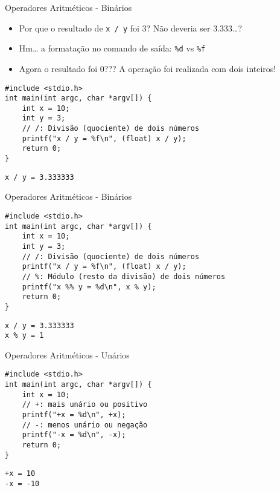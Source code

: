 \documentclass[t, aspectratio=169]{beamer}
\begin{document}
\begin{frame}[label={sec:orgf51f90c},fragile]{Operadores Aritméticos - Binários}
 \begin{itemize}
\item Por que o resultado de \texttt{x / y} foi 3? Não deveria ser 3.333\ldots{}?
\item Hm\ldots{} a formatação no comando de saída: \texttt{\%d} vs \texttt{\%f}
\item Agora o resultado foi 0??? A operação foi realizada com dois \alert{inteiros!}
\end{itemize}

\vspace{-0.25cm}
\begin{verbatim}
#include <stdio.h>
int main(int argc, char *argv[]) {
    int x = 10;
    int y = 3;
    // /: Divisão (quociente) de dois números
    printf("x / y = %f\n", (float) x / y);
    return 0;
}
\end{verbatim}

\begin{verbatim}
x / y = 3.333333
\end{verbatim}
\end{frame}

\begin{frame}[label={sec:org64bba93},fragile]{Operadores Aritméticos - Binários}
 \vspace{-0.5cm}
\begin{verbatim}
#include <stdio.h>
int main(int argc, char *argv[]) {
    int x = 10;
    int y = 3;
    // /: Divisão (quociente) de dois números
    printf("x / y = %f\n", (float) x / y);
    // %: Módulo (resto da divisão) de dois números
    printf("x %% y = %d\n", x % y);
    return 0;
}
\end{verbatim}

\begin{verbatim}
x / y = 3.333333
x % y = 1
\end{verbatim}
\end{frame}

\begin{frame}[label={sec:org57abf8f},fragile]{Operadores Aritméticos - Unários}
 \vspace{-0.5cm}
\begin{verbatim}
#include <stdio.h>
int main(int argc, char *argv[]) {
    int x = 10;
    // +: mais unário ou positivo
    printf("+x = %d\n", +x);
    // -: menos unário ou negação
    printf("-x = %d\n", -x);
    return 0;
}
\end{verbatim}

\begin{verbatim}
+x = 10
-x = -10
\end{verbatim}
\end{frame}
\end{document}
